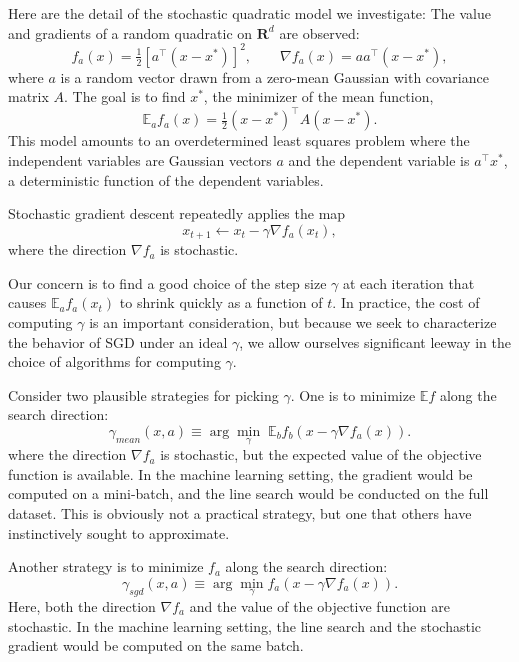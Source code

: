 \documentclass{article}
\newcommand{\half}{\tfrac{1}{2}}
\newcommand{\E}{\mathbb{E}}
\newcommand{\R}{\mathbf{R}}
\begin{document}
Here are the detail of the stochastic quadratic model we investigate: The value and gradients of a random quadratic on $\R^d$ are observed:
\begin{equation}\label{eq:stoch-model}
f_a(x) = \half \left[a^\top (x-x^*)\right]^2, \qquad \nabla f_a(x) = aa^\top (x-x^*),
\end{equation}
where $a$ is a random vector drawn from a zero-mean Gaussian with covariance matrix $A$. The goal is to find $x^*$, the minimizer of the mean function,
\begin{equation}\label{eq:mean-model}
 \E_a f_a(x) = \half (x-x^*)^\top A (x-x^*).
\end{equation}
This model amounts to an overdetermined least squares problem where the independent variables are Gaussian vectors $a$ and the dependent variable is $a^\top x^*$,  a deterministic function of the dependent variables.

Stochastic gradient descent repeatedly applies the map
\begin{equation}
x_{t+1} \leftarrow x_t - \gamma \nabla f_a(x_t), \label{eq:sgd}
\end{equation}
where the direction $\nabla f_a$ is stochastic.

Our concern is to find a good choice of the step size $\gamma$ at each iteration that causes $\E_a f_a(x_t)$ to shrink quickly as a function of $t$. In practice, the cost of computing $\gamma$ is an important consideration, but because we seek to characterize the behavior of SGD under an ideal $\gamma$, we allow ourselves significant leeway in the choice of algorithms for computing $\gamma$.

Consider two plausible strategies for picking $\gamma$. One is to minimize $\E f$ along the search direction:
$$\gamma_{mean}(x,a) \equiv \arg\min_\gamma\; \E_b f_b(x-\gamma \nabla f_a(x)).$$
where the direction $\nabla f_a$ is stochastic, but the expected value of the objective function is available. In the machine learning setting, the gradient would be computed on a mini-batch, and the line search would be conducted on the full dataset. This is obviously not a practical strategy, but one that others have instinctively sought to approximate.

Another strategy is to minimize $f_a$ along the search direction:
$$\gamma_{sgd}(x,a) \equiv \arg\min_\gamma f_a(x-\gamma \nabla f_a(x)).$$
Here, both the direction $\nabla f_a$ and the value of the objective function are stochastic. In the machine learning setting, the line search and the stochastic gradient would be computed on the same batch.
\end{document}
